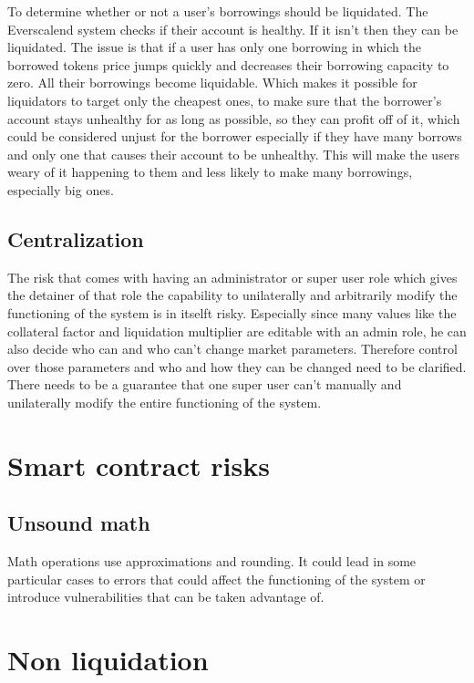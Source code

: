 To determine whether or not a user's borrowings should be liquidated. The Everscalend system checks if their account is healthy. If it isn't then they can be liquidated. The issue is that if a user has only one borrowing in which the borrowed tokens price jumps quickly and decreases their borrowing capacity to zero. All their borrowings become liquidable. Which makes it possible for liquidators to target only the cheapest ones, to make sure that the borrower's account stays unhealthy for as long as possible, so they can profit off of it, which could be considered unjust for the borrower especially if they have many borrows and only one that causes their account to be unhealthy. This will make the users weary of it happening to them and less likely to make many borrowings, especially big ones.

\subsection{Centralization}

The risk that comes with having an administrator or super user role which gives the detainer of that role the capability to unilaterally and arbitrarily modify the functioning of the system is in itselft risky. Especially since many values like the collateral factor and liquidation multiplier are editable with an admin role, he can also decide who can and who can't change market parameters. Therefore control over those parameters and who and how they can be changed need to be clarified. There needs to be a guarantee that one super user can't manually and unilaterally modify the entire functioning of the system.


\section{Smart contract risks}

\subsection{Unsound math}

Math operations use approximations and rounding. It could lead in some particular cases to errors that could affect the functioning of the system or introduce vulnerabilities that can be taken advantage of.

\section{Non liquidation}


